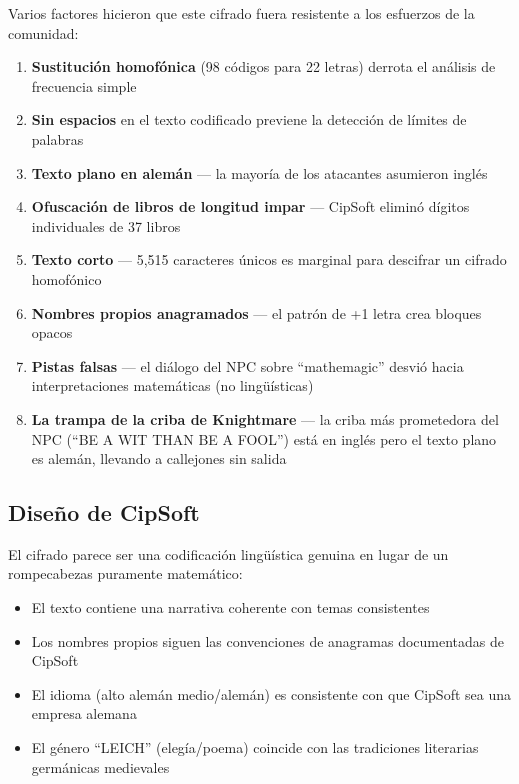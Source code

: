 \documentclass[11pt,a4paper]{article}
\begin{document}
Varios factores hicieron que este cifrado fuera resistente a los esfuerzos de la comunidad:

\begin{enumerate}
\item \textbf{Sustituci\'{o}n homof\'{o}nica} (98 c\'{o}digos para 22 letras) derrota el an\'{a}lisis de frecuencia simple
\item \textbf{Sin espacios} en el texto codificado previene la detecci\'{o}n de l\'{i}mites de palabras
\item \textbf{Texto plano en alem\'{a}n} --- la mayor\'{i}a de los atacantes asumieron ingl\'{e}s
\item \textbf{Ofuscaci\'{o}n de libros de longitud impar} --- CipSoft elimin\'{o} d\'{i}gitos individuales de 37 libros
\item \textbf{Texto corto} --- 5,515 caracteres \'{u}nicos es marginal para descifrar un cifrado homof\'{o}nico
\item \textbf{Nombres propios anagramados} --- el patr\'{o}n de +1 letra crea bloques opacos
\item \textbf{Pistas falsas} --- el di\'{a}logo del NPC sobre ``mathemagic'' desvi\'{o} hacia interpretaciones matem\'{a}ticas (no ling\"{u}\'{i}sticas)
\item \textbf{La trampa de la criba de Knightmare} --- la criba m\'{a}s prometedora del NPC (``BE A WIT THAN BE A FOOL'') est\'{a} en ingl\'{e}s pero el texto plano es alem\'{a}n, llevando a callejones sin salida
\end{enumerate}

\subsection{Dise\~{n}o de CipSoft}

El cifrado parece ser una codificaci\'{o}n ling\"{u}\'{i}stica genuina en lugar de un rompecabezas puramente matem\'{a}tico:

\begin{itemize}
\item El texto contiene una narrativa coherente con temas consistentes
\item Los nombres propios siguen las convenciones de anagramas documentadas de CipSoft
\item El idioma (alto alem\'{a}n medio/alem\'{a}n) es consistente con que CipSoft sea una empresa alemana
\item El g\'{e}nero ``LEICH'' (eleg\'{i}a/poema) coincide con las tradiciones literarias germ\'{a}nicas medievales
\end{itemize}
\end{document}
